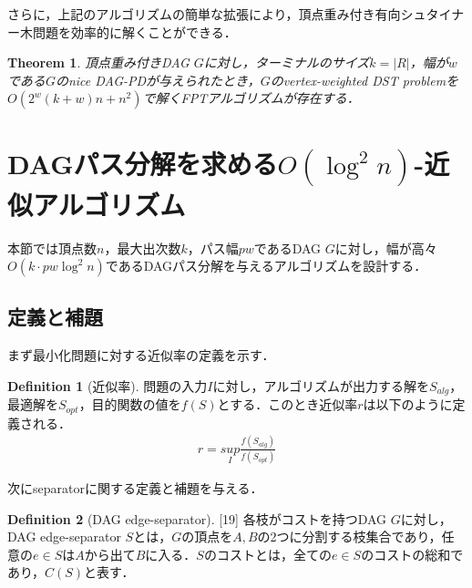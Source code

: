 \documentclass[master]{kuisthesis}		%
\theoremstyle{plain}
\newtheorem{theorem}{Theorem}
\theoremstyle{definition}
\newtheorem{definition*}{Definition}
\begin{document}
さらに，上記のアルゴリズムの簡単な拡張により，頂点重み付き有向シュタイナー木問題を効率的に解くことができる．

\begin{theorem}
    頂点重み付きDAG $G$に対し，ターミナルのサイズ$k=|R|$，幅が$w$である$G$のnice DAG-PDが与えられたとき，$G$のvertex-weighted DST problemを$O(2^w(k+w)n + n^2)$で解くFPTアルゴリズムが存在する．
\end{theorem}





























\section{DAGパス分解を求める$O(\log ^2 n)$-近似アルゴリズム} %
本節では頂点数$n$，最大出次数$k$，パス幅$pw$であるDAG $G$に対し，幅が高々$O(k \cdot pw \log ^2 n)$であるDAGパス分解を与えるアルゴリズムを設計する．

\subsection{定義と補題}
まず最小化問題に対する近似率の定義を示す．

\begin{definition*}[近似率]
    問題の入力$I$に対し，アルゴリズムが出力する解を$S_{alg}$，最適解を$S_{opt}$，目的関数の値を$f(S)$とする．このとき近似率$r$は以下のように定義される．
    \begin{align*}
        r = \underset{I}{sup}\frac{f(S_{alg})}{f(S_{opt})}
    \end{align*}
    
\end{definition*}


次にseparatorに関する定義と補題を与える．


\begin{definition*}[DAG edge-separator][19]
    各枝がコストを持つDAG $G$に対し，DAG edge-separator $S$とは，$G$の頂点を$A, B$の2つに分割する枝集合であり，任意の$e \in S$は$A$から出て$B$に入る．$S$のコストとは，全ての$e \in S$のコストの総和であり，$C(S)$と表す．
\end{definition*}
\end{document}
